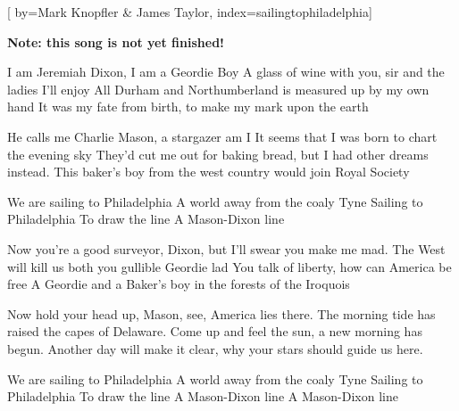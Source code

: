 
[%
    by={Mark Knopfler \& James Taylor},
    index={sailingtophiladelphia}]


    \label{sailingtophiladelphia}

    \textbf{Note: this song is not yet finished!}

    \beginverse*
    \endverse

    \beginverse\memorize
        I am Jeremiah Dixon, I am a Geordie Boy
        A glass of wine with you, sir and the ladies I'll enjoy
        All Durham and Northumberland is measured up by my own hand
        It was my fate from birth, to make my mark upon the earth
    \endverse

    \beginverse
        He calls me Charlie Mason, a stargazer am I
        It seems that I was born to chart the evening sky
        They'd cut me out for baking bread, but I had other dreams instead.
        This baker's boy from the west country would join Royal Society
    \endverse

    \beginchorus
        We are sailing to Philadelphia
        A world away from the coaly Tyne
        Sailing to Philadelphia
        To draw the line
        A Mason-Dixon line
    \endchorus

    \beginverse*
    \endverse

    \beginverse
        Now you're a good surveyor, Dixon, but I'll swear you make me mad.
        The West will kill us both you gullible Geordie lad
        You talk of liberty, how can America be free
        A Geordie and a Baker's boy in the forests of the Iroquois
    \endverse

    \beginverse
        Now hold your head up, Mason, see, America lies there.
        The morning tide has raised the capes of Delaware.
        Come up and feel the sun, a new morning has begun.
        Another day will make it clear, why your stars should guide us here.
    \endverse

    \beginchorus
        We are sailing to Philadelphia
        A world away from the coaly Tyne
        Sailing to Philadelphia
        To draw the line
        A Mason-Dixon line
        A Mason-Dixon line
    \endchorus

    \beginverse*
    \endverse
\endsong
